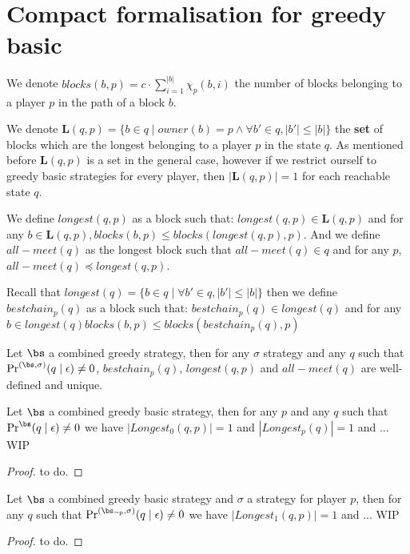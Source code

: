 
\section{Compact formalisation for greedy basic}


We denote
$
blocks(b,p)  =
{\displaystyle c \cdot \sum_{i=1}^{|b|} \chi_p(b,i)}
$ the number of blocks belonging to a player $p$ in the path of a block $b$.

We denote
$\mathbf{L}(q,p) = \{b \in q \mid owner(b) = p \land \forall b' \in q, |b'| \leq |b|  \}$ the \textbf{set} of blocks which are the longest belonging to a player $p$ in the state $q$.
As mentioned before $\mathbf{L}(q,p)$ is a set in the general case, however if we restrict ourself to greedy basic strategies for every player, then $|\mathbf{L}(q,p)| = 1$ for each reachable state $q$.

We define $longest(q,p)$ as a block such that: $longest(q,p) \in \mathbf{L}(q,p)$ and for any $b \in \mathbf{L}(q,p), blocks(b,p) \leq blocks(longest(q,p),p)$. And we define $all-meet(q)$ as the longest block such that $all-meet(q) \in q$ and for any $p$, $all-meet(q) \preceq longest(q,p)$.

Recall that $longest(q) = \{b\in q \mid \forall b' \in q, |b'| \leq |b| \}$ then we define
$bestchain_p(q)$ as a block such that: $bestchain_p(q) \in  longest(q)$ and for any $ b \in longest(q) blocks(b,p) \leq blocks(bestchain_p(q),p)$

\begin{myprop}
Let $\bs$ a combined greedy strategy, then for any $\sigma$ strategy and any $q$ such that $\Pr^{(\bs,\sigma)}(q \mid \epsilon) \neq 0$, $bestchain_p(q)$, $longest(q,p)$ and $all-meet(q)$ are well-defined and unique.
\end{myprop}



\iffalse
\begin{myprop}
Let $\bs$ a combined greedy basic strategy, then for any $p$ and any $q$  such that $\Pr^{\bs}(q \mid \epsilon) \neq 0$ we have $|Longest_0(q,p)| = 1$ and $|Longest_p(q)| = 1$ and ... WIP
\end{myprop}
\begin{proof}
to do.
\end{proof}

\begin{myprop}
Let $\bs$ a combined greedy basic strategy and $\sigma$ a strategy for player $p$, then for any $q$ such that $\Pr^{(\bs_{\lnot p},\sigma)}(q \mid \epsilon) \neq 0$ we have $|Longest_1(q,p)| = 1$ and ... WIP
\end{myprop}
\begin{proof}
to do.
\end{proof}

